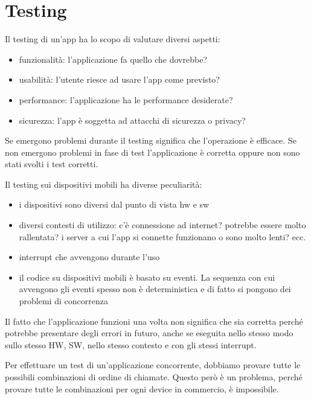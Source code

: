 \section{Testing}
Il testing di un'app ha lo scopo di valutare diversi aspetti:
\begin{itemize}
    \item funzionalità: l'applicazione fa quello che dovrebbe?
    \item usabilità: l'utente riesce ad usare l'app come previsto?
    \item performance: l'applicazione ha le performance desiderate?
    \item sicurezza: l'app è soggetta ad attacchi di sicurezza o privacy?
\end{itemize}

Se emergono problemi durante il testing significa che l'operazione è efficace. 
Se non emergono problemi in fase di test l'applicazione è corretta oppure non sono stati svolti i test corretti. 

Il testing sui dispositivi mobili ha diverse peculiarità: 
\begin{itemize}
    \item i dispositivi sono diversi dal punto di vista hw e sw
    \item diversi contesti di utilizzo: c'è connessione ad internet? potrebbe essere molto rallentata? i server a cui l'app si connette funzionano o sono molto lenti? ecc.
    \item interrupt che avvengono durante l'uso
    \item il codice su dispositivi mobili è basato su eventi. La sequenza con cui avvengono gli eventi spesso non è deterministica e di fatto si pongono dei problemi di concorrenza
\end{itemize}

Il fatto che l’applicazione funzioni una volta non significa che sia corretta perché potrebbe presentare degli errori in futuro, anche se eseguita nello stesso modo sullo stesso HW, SW, nello stesso contesto e con gli stessi interrupt.

Per effettuare un test di un'applicazione concorrente, dobbiamo provare tutte le possibili combinazioni di ordine di chiamate.
Questo però è un problema, perché provare tutte le combinazioni  per ogni device in commercio, è impossibile.


